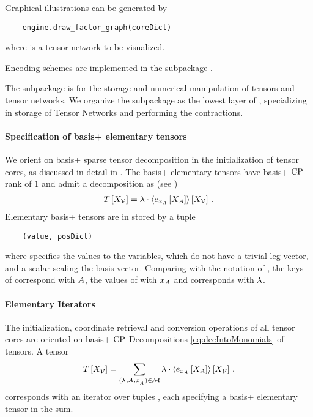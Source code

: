 Graphical illustrations can be generated by
\begin{lstlisting}
	engine.draw_factor_graph(coreDict)
\end{lstlisting}
where  is a tensor network to be visualized.


\subsect{\bnencoding}
Encoding schemes are implemented in the subpackage \sprepresentation.



\label{sec:implementationEngine}

The \spengine subpackage is for the storage and numerical manipulation of tensors and tensor networks.
We organize the subpackage as the lowest layer of \tnreason, specializing in storage of Tensor Networks and performing the contractions.


\paragraph{Specification of basis+ elementary tensors}
We orient on basis+ sparse tensor decomposition in the initialization of tensor cores, as discussed in detail in .
The basis+ elementary tensors have basis+ $\mathrm{CP}$ rank of $1$ and admit a decomposition as (see )
\begin{align*}
    T\left[X_{\mathcal{V}}\right]
    = \lambda \cdot \left\langle e_{x_{A}}\left[X_{A}\right]\right\rangle \left[ X_{\mathcal{V}} \right] \, .
\end{align*}
Elementary basis+ tensors are in \tnreason stored by a tuple
\begin{lstlisting}
	(value, posDict)
\end{lstlisting}
where  specifies the values to the variables, which do not have a trivial leg vector, and  a scalar scaling the basis vector.
Comparing with the notation of , the keys of  correspond with $A$, the values of  with $x_{A}$ and  corresponds with $\lambda$.

\paragraph{Elementary Iterators}
The initialization, coordinate retrieval and conversion operations of all tensor cores are oriented on basis+ $\mathrm{CP}$ Decompositions \eqref{eq:decIntoMonomials} of tensors.
A tensor
\begin{align*}
    T\left[X_{\mathcal{V}}\right]
    = \sum_{(\lambda^{}, A^{}, x_{A^{}}^{})\in\mathcal{M}} \lambda \cdot \left\langle e_{x_{A}}\left[X_{A}\right]\right\rangle \left[ X_{\mathcal{V}} \right] \, .
\end{align*}
corresponds with an iterator over tuples , each specifying a basis+ elementary tensor in the sum.

